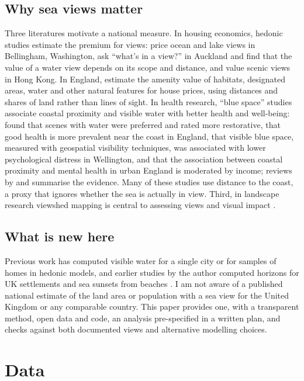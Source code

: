 \subsection{Why sea views matter}
Three literatures motivate a national measure. In housing economics, hedonic studies estimate the premium for views: \citet{benson1998} price ocean and lake views in Bellingham, Washington, \citet{bourassa2004} ask ``what's in a view?'' in Auckland and find that the value of a water view depends on its scope and distance, and \citet{jim2009} value scenic views in Hong Kong. In England, \citet{gibbons2014} estimate the amenity value of habitats, designated areas, water and other natural features for house prices, using distances and shares of land rather than lines of sight. In health research, ``blue space'' studies associate coastal proximity and visible water with better health and well-being: \citet{white2010} found that scenes with water were preferred and rated more restorative, \citet{wheeler2012} that good health is more prevalent near the coast in England, \citet{nutsford2016} that visible blue space, measured with geospatial visibility techniques, was associated with lower psychological distress in Wellington, and \citet{garrett2019} that the association between coastal proximity and mental health in urban England is moderated by income; reviews by \citet{volker2011} and \citet{gascon2017} summarise the evidence. Many of these studies use distance to the coast, a proxy that ignores whether the sea is actually in view. Third, in landscape research viewshed mapping is central to assessing views and visual impact \citep{bishop2003}.

\subsection{What is new here}
Previous work has computed visible water for a single city \citep{nutsford2016} or for samples of homes in hedonic models, and earlier studies by the author computed horizons for UK settlements \citep{hotham2026sunless} and sea sunsets from beaches \citep{hotham2026sunsets}. I am not aware of a published national estimate of the land area or population with a sea view for the United Kingdom or any comparable country. This paper provides one, with a transparent method, open data and code, an analysis pre-specified in a written plan, and checks against both documented views and alternative modelling choices.

\section{Data}\label{sec:data}
